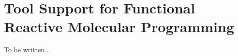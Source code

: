 
\section{Tool Support for Functional Reactive Molecular Programming}
\label{sec:software_support}

To be written...


